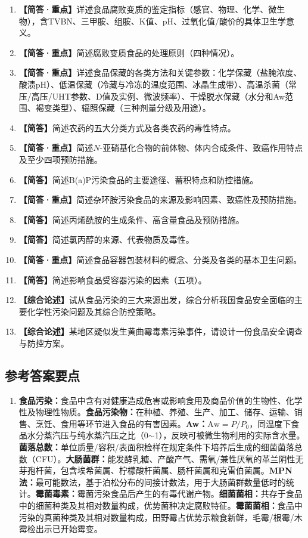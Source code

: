 {\begin{enumerate}[leftmargin=*, itemsep=8pt]
    \item \textbf{【简答·重点】}详述食品腐败变质的鉴定指标（感官、物理、化学、微生物），含TVBN、三甲胺、组胺、K值、pH、过氧化值/酸价的具体卫生学意义。
    \item \textbf{【简答·重点】}简述腐败变质食品的处理原则（四种情况）。
    \item \textbf{【简答·重点】}详述食品保藏的各类方法和关键参数：化学保藏（盐腌浓度、酸渍pH）、低温保藏（冷藏与冷冻的温度范围、冰晶生成带）、高温杀菌（常压/高压/UHT参数、D值及实例、微波频率）、干燥脱水保藏（水分和Aw范围、褐变类型）、辐照保藏（三种剂量分级及用途）。
    \item \textbf{【简答】}简述农药的五大分类方式及各类农药的毒性特点。
    \item \textbf{【简答·重点】}简述$N$-亚硝基化合物的前体物、体内合成条件、致癌作用特点及至少四项预防措施。
    \item \textbf{【简答】}简述B(a)P污染食品的主要途径、蓄积特点和防控措施。
    \item \textbf{【简答·重点】}简述杂环胺污染食品的来源及影响因素、致癌性及预防措施。
    \item \textbf{【简答】}简述丙烯酰胺的生成条件、高含量食品及预防措施。
    \item \textbf{【简答】}简述氯丙醇的来源、代表物质及毒性。
    \item \textbf{【简答·重点】}简述食品容器包装材料的概念、分类及各类的基本卫生问题。
    \item \textbf{【简答】}简述影响食品受容器污染的因素（五项）。
    \item \textbf{【综合论述】}试从食品污染的三大来源出发，综合分析我国食品安全面临的主要化学性污染问题及其综合防控策略。
    \item \textbf{【综合论述】}某地区疑似发生黄曲霉毒素污染事件，请设计一份食品安全调查与防控方案。
\end{enumerate}

\subsection*{参考答案要点}

\begin{enumerate}[leftmargin=*, itemsep=6pt]
    \item \textbf{食品污染：}食品中含有对健康造成危害或影响食用及商品价值的生物性、化学性及物理性物质。\textbf{食品污染物：}在种植、养殖、生产、加工、储存、运输、销售、烹饪、食用等环节进入食品的有害因素。\textbf{Aw：}$\text{Aw}=P/P_0$，同温度下食品水分蒸汽压与纯水蒸汽压之比（0$\sim$1），反映可被微生物利用的实际含水量。\textbf{菌落总数：}单位质量/容积/表面积检样在规定条件下培养后生成的细菌菌落总数（CFU）。\textbf{大肠菌群：}能发酵乳糖、产酸产气、需氧/兼性厌氧的革兰阴性无芽孢杆菌，包含埃希菌属、柠檬酸杆菌属、肠杆菌属和克雷伯菌属。\textbf{MPN法：}最可能数法，基于泊松分布的间接计数法，用于大肠菌群数量低时的统计。\textbf{霉菌毒素：}霉菌污染食品后产生的有毒代谢产物。\textbf{细菌菌相：}共存于食品中的细菌种类及其相对数量构成，优势菌种决定腐败特征。\textbf{霉菌菌相：}食品中污染的真菌种类及其相对数量构成，田野霉占优势示粮食新鲜，毛霉/根霉/木霉检出示已开始霉变。


\end{enumerate}}
